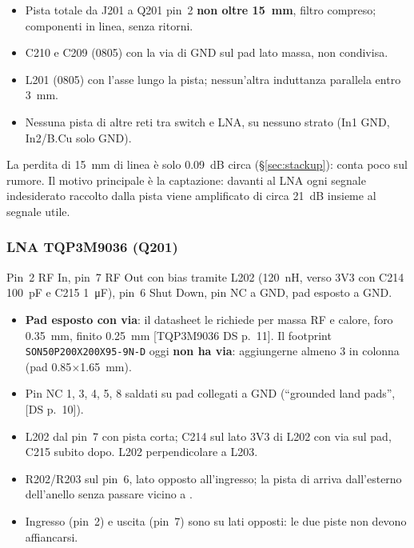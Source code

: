 \documentclass[a4paper,10pt]{article}
\newcommand{\net}[1]{\texttt{\detokenize{#1}}}
\newcommand{\fonte}[1]{{\footnotesize\color{sbgray}[#1]}}
\newcounter{regola}
\begin{document}
\begin{regola}
\begin{itemize}
\item Pista totale da J201 a Q201 pin~2 \textbf{non oltre \SI{15}{mm}}, filtro compreso; componenti in
      linea, senza ritorni.
\item C210 e C209 (0805) con la via di GND sul pad lato massa, non condivisa.
\item L201 (0805) con l'asse lungo la pista; nessun'altra induttanza parallela entro \SI{3}{mm}.
\item Nessuna pista di altre reti tra switch e LNA, su nessuno strato (In1 GND, In2/B.Cu solo GND).
\end{itemize}
\end{regola}

\begin{perche}
La perdita di \SI{15}{mm} di linea è solo \SI{0.09}{dB} circa (\S\ref{sec:stackup}): conta poco sul rumore.
Il motivo principale è la captazione: davanti al LNA ogni segnale indesiderato raccolto dalla pista viene
amplificato di circa \SI{21}{dB} insieme al segnale utile.
\end{perche}

\subsubsection{LNA TQP3M9036 (Q201)}
Pin~2 RF In, pin~7 RF Out con bias tramite L202 (\SI{120}{nH}, verso 3V3 con C214 \SI{100}{pF} e
C215 \SI{1}{\micro F}), pin~6 Shut Down, pin NC a GND, pad esposto a GND.

\begin{regola}[Q201]
\begin{itemize}
\item \textbf{Pad esposto con via}: il datasheet le richiede per massa RF e calore, foro \SI{0.35}{mm},
      finito \SI{0.25}{mm} \fonte{TQP3M9036 DS p.~11}. Il footprint \texttt{SON50P200X200X95-9N-D} oggi
      \textbf{non ha via}: aggiungerne almeno 3 in colonna (pad \SI{0.85}{}$\times$\SI{1.65}{mm}).
\item Pin NC 1, 3, 4, 5, 8 saldati su pad collegati a GND (\enquote{grounded land pads}, \fonte{DS p.~10}).
\item L202 dal pin~7 con pista corta; C214 sul lato 3V3 di L202 con via sul pad, C215 subito dopo.
      L202 perpendicolare a L203.
\item R202/R203 sul pin~6, lato opposto all'ingresso; la pista di \net{EN_RX_LNA} arriva dall'esterno
      dell'anello senza passare vicino a \net{RF_LNA_IN}.
\item Ingresso (pin~2) e uscita (pin~7) sono su lati opposti: le due piste non devono affiancarsi.
\end{itemize}
\end{regola}
\end{document}

